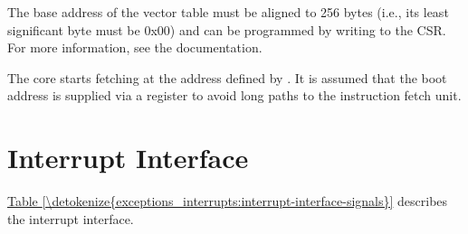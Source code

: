 \documentclass[letterpaper,10pt,english]{sphinxmanual}
\begin{document}
\sphinxAtStartPar
The base address of the vector table must be aligned to 256 bytes (i.e., its least significant byte must be 0x00) and can be programmed
by writing to the  CSR. For more information, see the {\hyperref[\detokenize{control_status_registers:cs-registers}]{}} documentation.

\sphinxAtStartPar
The core starts fetching at the address defined by . It is assumed that the boot address is supplied via a register
to avoid long paths to the instruction fetch unit.


\section{Interrupt Interface}
\label{\detokenize{exceptions_interrupts:interrupt-interface}}
\sphinxAtStartPar
\hyperref[\detokenize{exceptions_interrupts:interrupt-interface-signals}]{Table \ref{\detokenize{exceptions_interrupts:interrupt-interface-signals}}} describes the interrupt interface.
\end{document}
